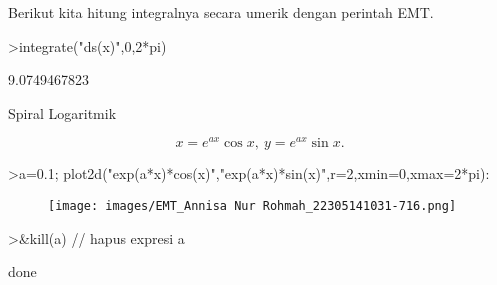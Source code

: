 \documentclass[a4paper,10pt]{article}
\begin{document}
\begin{eulernotebook}
\begin{eulercomment}
Berikut kita hitung integralnya secara umerik dengan perintah EMT.
\end{eulercomment}
\begin{eulerprompt}
>integrate("ds(x)",0,2*pi)
\end{eulerprompt}
\begin{euleroutput}
  9.0749467823
\end{euleroutput}
\begin{eulercomment}
Spiral Logaritmik

\end{eulercomment}
\begin{eulerformula}
\[
x=e^{ax}\cos x,\ y=e^{ax}\sin x.
\]
\end{eulerformula}
\begin{eulerprompt}
>a=0.1; plot2d("exp(a*x)*cos(x)","exp(a*x)*sin(x)",r=2,xmin=0,xmax=2*pi):
\end{eulerprompt}
\begin{figure}[h]
    \centering
    \texttt{[image: images/EMT\_Annisa Nur Rohmah\_22305141031-716.png]}
\end{figure}
\begin{eulerprompt}
>&kill(a) // hapus expresi a
\end{eulerprompt}
\begin{euleroutput}
  
                                   done
  

\end{euleroutput}
\end{eulernotebook}
\end{document}
